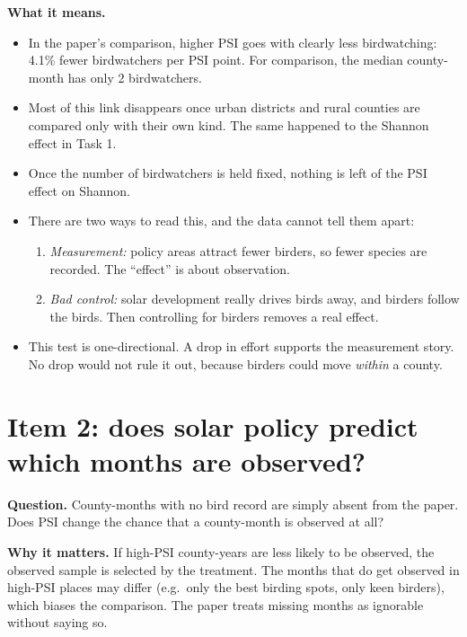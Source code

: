 \documentclass[11pt]{article}
\begin{document}
\textbf{What it means.}
\begin{itemize}[leftmargin=14pt,itemsep=1pt]
\item In the paper's comparison, higher PSI goes with clearly less birdwatching: 4.1\% fewer birdwatchers per PSI point. For comparison, the median county-month has only 2 birdwatchers.
\item Most of this link disappears once urban districts and rural counties are compared only with their own kind. The same happened to the Shannon effect in Task 1.
\item Once the number of birdwatchers is held fixed, nothing is left of the PSI effect on Shannon.
\item There are two ways to read this, and the data cannot tell them apart:
  \begin{enumerate}[leftmargin=16pt,itemsep=0pt]
  \item \emph{Measurement:} policy areas attract fewer birders, so fewer species are recorded. The ``effect'' is about observation.
  \item \emph{Bad control:} solar development really drives birds away, and birders follow the birds. Then controlling for birders removes a real effect.
  \end{enumerate}
\item This test is one-directional. A drop in effort supports the measurement story. No drop would not rule it out, because birders could move \emph{within} a county.
\end{itemize}

\section{Item 2: does solar policy predict which months are observed?}
\textbf{Question.} County-months with no bird record are simply absent from the paper. Does PSI change the chance that a county-month is observed at all?

\textbf{Why it matters.} If high-PSI county-years are less likely to be observed, the observed sample is selected by the treatment. The months that do get observed in high-PSI places may differ (e.g.\ only the best birding spots, only keen birders), which biases the comparison. The paper treats missing months as ignorable without saying so.
\end{document}

